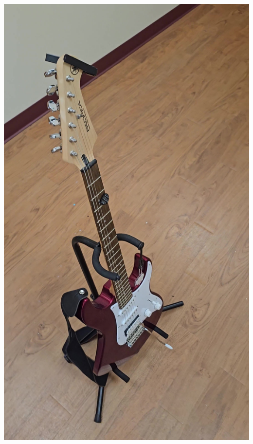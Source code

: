 \documentclass{article}
\begin{document}
\begin{center}
    \includegraphics[scale=0.02]{images/guitar2.jpg}

\end{center}
\end{document}
